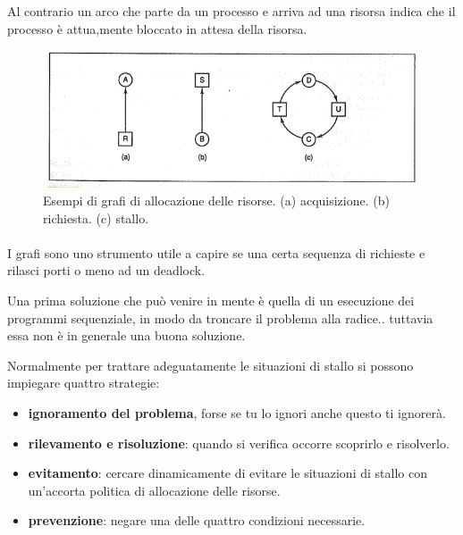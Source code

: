 Al contrario un arco che parte da un processo e arriva ad una risorsa indica che il processo è attua,mente bloccato in attesa della risorsa.

\begin{figure}[H]
    \centering
    \includegraphics[width=0.6\linewidth]{assets/grafo9.png}
    \caption{Esempi di grafi di allocazione delle risorse. (a) acquisizione. (b) richiesta. (c) stallo.}
\end{figure}

\paragraph*{}
I grafi sono uno strumento utile a capire se una certa sequenza di richieste e rilasci porti o meno ad un deadlock.

Una prima soluzione che può venire in mente è quella di un esecuzione dei programmi sequenziale, in modo da troncare il problema alla radice.. tuttavia essa non è in generale una buona soluzione.

Normalmente per trattare adeguatamente le situazioni di stallo si possono impiegare quattro strategie:
\begin{itemize}
    \item \textbf{ignoramento del problema}, forse se tu lo ignori anche questo ti ignorerà.
    \item \textbf{rilevamento e risoluzione}: quando si verifica occorre scoprirlo e risolverlo.
    \item \textbf{evitamento}: cercare dinamicamente di evitare le situazioni di stallo con un'accorta politica di allocazione delle risorse.
    \item \textbf{prevenzione}: negare una delle quattro condizioni necessarie.
\end{itemize}

\paragraph*{}
